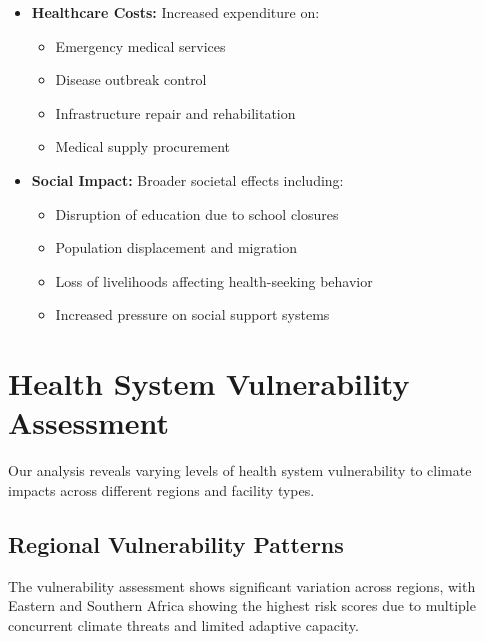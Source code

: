 \begin{itemize}
    \item \textbf{Healthcare Costs:} Increased expenditure on:
    \begin{itemize}
        \item Emergency medical services
        \item Disease outbreak control
        \item Infrastructure repair and rehabilitation
        \item Medical supply procurement
    \end{itemize}
    
    \item \textbf{Social Impact:} Broader societal effects including:
    \begin{itemize}
        \item Disruption of education due to school closures
        \item Population displacement and migration
        \item Loss of livelihoods affecting health-seeking behavior
        \item Increased pressure on social support systems
    \end{itemize}
\end{itemize}

\section{Health System Vulnerability Assessment}

Our analysis reveals varying levels of health system vulnerability to climate impacts across different regions and facility types.

\subsection{Regional Vulnerability Patterns}
The vulnerability assessment shows significant variation across regions, with Eastern and Southern Africa showing the highest risk scores due to multiple concurrent climate threats and limited adaptive capacity.

